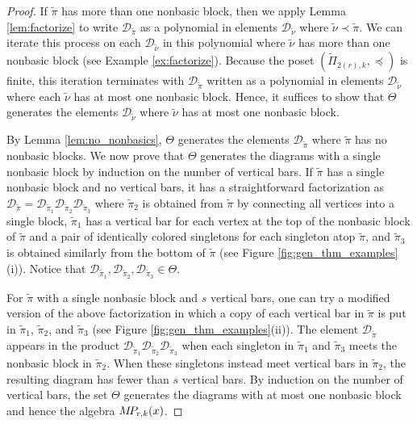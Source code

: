 \documentclass[10pt]{amsart}
\theoremstyle{definition}
\theoremstyle{definition}
\theoremstyle{plain}
\theoremstyle{remark}
\theoremstyle{plain}
\theoremstyle{plain}
\newcommand{\DD}{\mathcal{D}}
\newcommand{\MP}{{\rm M\!P\!}}
\newcommand{\tpi}{{\tilde{\pi}}}
\newcommand{\tnu}{{\tilde{\nu}}}
\begin{document}
\begin{proof}
    If $\tpi$ has more than one nonbasic block, then we apply Lemma \ref{lem:factorize} to write $\DD_\tpi$ as a polynomial in elements $\DD_\tnu$ where $\tnu\prec\tpi$. We can iterate this process on each $\DD_\tnu$ in this polynomial where $\tnu$ has more than one nonbasic block (see Example \ref{ex:factorize}). Because the poset $(\tilde\Pi_{2(r),k},\preceq)$ is finite, this iteration terminates with $\DD_\tpi$ written as a polynomial in elements $\DD_\tnu$ where each $\tnu$ has at most one nonbasic block. Hence, it suffices to show that $\Theta$ generates the elements $\DD_\tnu$ where $\tnu$ has at most one nonbasic block.

    By Lemma \ref{lem:no_nonbasics}, $\Theta$ generates the elements $\DD_\tpi$ where $\tpi$ has no nonbasic blocks. We now prove that $\Theta$ generates the diagrams with a single nonbasic block by induction on the number of vertical bars. If $\tpi$ has a single nonbasic block and no vertical bars, it has a straightforward factorization as $\DD_\tpi=\DD_{\tpi_1}\DD_{\tpi_2}\DD_{\tpi_3}$ where $\tpi_2$ is obtained from $\tpi$ by connecting all vertices into a single block, $\tpi_1$ has a vertical bar for each vertex at the top of the nonbasic block of $\tpi$ and a pair of identically colored singletons for each singleton atop $\tpi$, and $\tpi_3$ is obtained similarly from the bottom of $\tpi$ (see Figure \ref{fig:gen_thm_examples}(i)). Notice that $\DD_{\tpi_1},\DD_{\tpi_2},\DD_{\tpi_3}\in\Theta$.

    For $\tpi$ with a single nonbasic block and $s$ vertical bars, one can try a modified version of the above factorization in which a copy of each vertical bar in $\tpi$ is put in $\tpi_1$, $\tpi_2$, and $\tpi_3$ (see Figure \ref{fig:gen_thm_examples}(ii)). The element $\DD_\tpi$ appears in the product $\DD_{\tpi_1}\DD_{\tpi_2}\DD_{\tpi_3}$ when each singleton in $\tpi_1$ and $\tpi_3$ meets the nonbasic block in $\tpi_2$. When these singletons instead meet vertical bars in $\tpi_2$, the resulting diagram has fewer than $s$ vertical bars. By induction on the number of vertical bars, the set $\Theta$ generates the diagrams with at most one nonbasic block and hence the algebra $\MP_{r,k}(x)$.
\end{proof}
\end{document}
